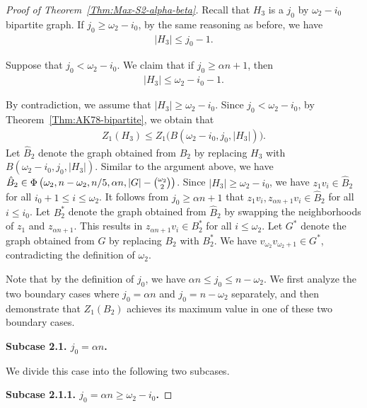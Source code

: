 \documentclass[11pt,a4paper]{article}
\begin{document}
\begin{proof}[Proof of Theorem~\ref{Thm:Max-S2-alpha-beta}]
Recall that $H_3$ is a $j_0$ by $\omega_2 - i_0$ bipartite graph. 
If $j_0 \ge \omega_2 - i_0$, by the same reasoning as before, we have  
\begin{align}\label{EQ:bound_H3_1}
|H_3| \le j_0-1. 
\end{align}

Suppose that $j_0 < \omega_2 - i_0$. 
We claim that if $j_0 \ge \alpha n+1$, then 
\begin{align}\label{EQ:bound_H3_2}
|H_3| \le \omega_2 -i_0 -1. 
\end{align}

By contradiction, we assume that $|H_3| \ge \omega_2 -i_0$. 
Since $j_0 < \omega_2 - i_0$, by Theorem~\ref{Thm:AK78-bipartite}, we obtain that 
\begin{align*}
Z_{1}(H_3) 
\le Z_{1}\big(B(\omega_2 -i_0, j_0, |H_3|) \big). 
\end{align*}
Let $\hat{B}_2$ denote the graph obtained from $B_2$ by replacing $H_3$ with $B(\omega_2 -i_0, j_0, |H_3|)$. 
Similar to the argument above, we have $ \hat{B}_2 \in \Phi\left(\omega_2,n-\omega_2, n/5, \alpha n, |G|-\tbinom{\omega_2}{2}\right)$. 
Since $|H_3| \ge \omega_2 -i_0$, we have $z_1v_i \in \hat{B}_2$ for all $i_0 + 1 \le i \le \omega_2$. 
It follows from $j_0 \ge \alpha n+1$ that $z_1v_i, z_{\alpha n+1}v_i \in \hat{B}_2$ for all $i \le i_0$. 
Let $B^{\ast}_2$ denote the graph obtained from $\hat{B}_2$ by swapping the neighborhoods of $z_1$ and $z_{\alpha n+1}$. 
This results in $z_{\alpha n +1} v_{i} \in B^{\ast}_2$ for all $i \le \omega_2$. 
Let $G^{\ast}$ denote the graph obtained from $G$ by replacing $B_2$ with $B^{\ast}_2$. 
We have $v_{\omega_2} v_{\omega_2+1}  \in G^{\ast}$, contradicting the definition of $\omega_2$. 

Note that by the definition of $j_0$, we have $\alpha n \le j_0 \le n - \omega_2$. 
We first analyze the two boundary cases where $j_0 = \alpha n$ and $j_0 = n - \omega_2$ separately, and then demonstrate that $Z_{1}(B_2)$ achieves its maximum value in one of these two boundary cases. 

\textbf{Subcase 2.1. $j_0 = \alpha n$. } 

We divide this case into the following two subcases. 

\textbf{Subcase 2.1.1. $j_0 = \alpha n \ge \omega_2 - i_0$. }


\end{proof}
\end{document}
